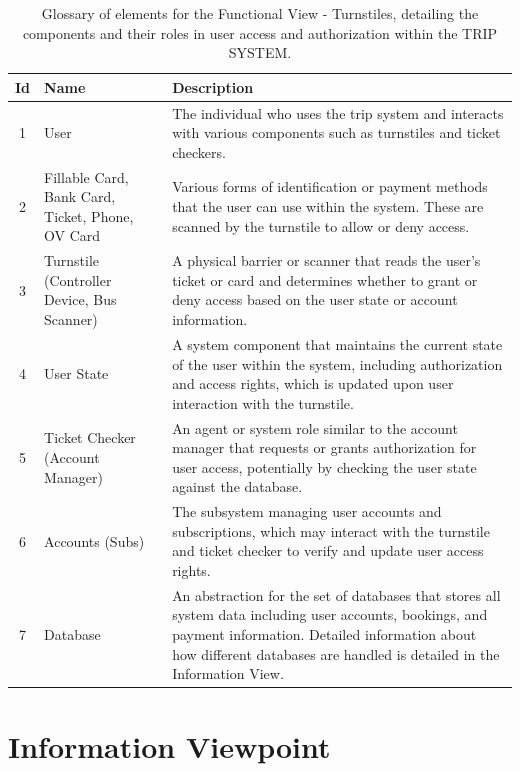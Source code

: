 \begin{table}[H] %
    \centering
    \begin{tabular}{@{}clp{9cm}@{}} %
    \toprule
    \textbf{Id} & \textbf{Name} & \textbf{Description} \\
    \midrule
    1 & User & The individual who uses the trip system and interacts with various components such as turnstiles and ticket checkers. \\
    2 & Fillable Card, Bank Card, Ticket, Phone, OV Card & Various forms of identification or payment methods that the user can use within the system. These are scanned by the turnstile to allow or deny access. \\
    3 & Turnstile (Controller Device, Bus Scanner) & A physical barrier or scanner that reads the user's ticket or card and determines whether to grant or deny access based on the user state or account information. \\
    4 & User State & A system component that maintains the current state of the user within the system, including authorization and access rights, which is updated upon user interaction with the turnstile. \\
    5 & Ticket Checker (Account Manager) & An agent or system role similar to the account manager that requests or grants authorization for user access, potentially by checking the user state against the database. \\
    6 & Accounts (Subs) & The subsystem managing user accounts and subscriptions, which may interact with the turnstile and ticket checker to verify and update user access rights. \\
    7 & Database & An abstraction for the set of databases that stores all system data including user accounts, bookings, and payment information. Detailed information about how different databases are handled is detailed in the Information View.\\
    \bottomrule
    \end{tabular}
    \caption{Glossary of elements for the Functional View - Turnstiles, detailing the components and their roles in user access and authorization within the TRIP SYSTEM.}
    \label{tab:glossary_turnstiles}
\end{table}

\section{Information Viewpoint}

